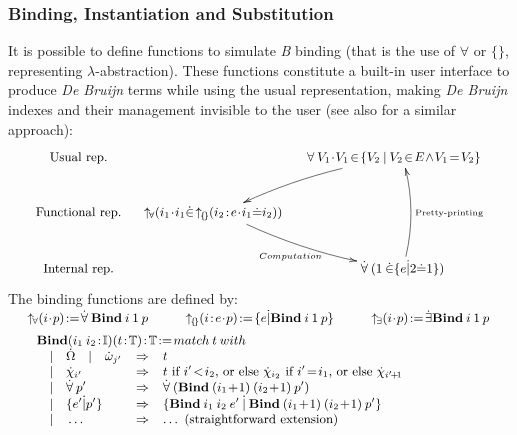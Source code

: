 \documentclass{llncs}
\begin{document}
\subsubsection{Binding, Instantiation and Substitution} It is possible to define functions to 
simulate \emph{B} binding (that is the use of $\forall$ or $\{\}$, representing 
$\lambda$-abstraction). These functions constitute a built-in user interface to produce 
\emph{De Bruijn} terms while using the usual representation, making \emph{De Bruijn} indexes 
and their management invisible to the user (see also \cite{gor:1} for a similar approach):
\[
\small
\xymatrix{
\text{Usual rep.} & & \!\!\!\!\!\!\!\!\forall\:V_1\!\cdot\!V_1\!\in\!
  \{V_2\:|\:V_2\!\in\!E\!\land\!V_1\!=\!V_2\}
 \ar@/_/@{->}[dl]  \ar@/^/@{<-}[dd]^{\text{Pretty-printing}}\\
\text{Functional rep.} &
\!\!\!\!\!\!\!\!\Bbdfor{i_1}{i_1\pins\Bbdcmp{i_2}{e}{i_1\pequ i_2}}
\ar@/_/@{->}[dr]_{Computation\quad}\\
\text{Internal rep.} & & \pfor(\dbone\:\pins\ecmp{e}{\dbtwo\pequ\dbone})\\
}
\]
The binding functions are defined by:
\[
\small
\begin{array}{lll}
\vspace{-16pt}\\
\Bbdfor{i}{p}\!:=\!\pfor \Bcmd{Bind}\:i\:\dbone\:p \quad & \quad
\Bbdcmp{i}{e}{p}\!:=\!\ecmp{e}{\Bcmd{Bind}\:i\:\dbone\:p} \quad & \quad
\Bbdexs{i}{p}\!:=\!\pexs \Bcmd{Bind}\:i\:\dbone\:p \\
\multicolumn{3}{l}{
\begin{array}{lcl}
\vspace{-6pt}\\
\multicolumn{3}{l}{\Bcmd{Bind}(i_1\:i_2\!:\!\Bidx)(t\!:\!\Btrm)\!:\!\Btrm\!:=\!match\:t\:with}
\\
\quad | \quad \ebig \quad|\quad \ebie{j'} & \Rightarrow & t\\
\quad | \quad \evar{i'} & \Rightarrow &
 t\text{ if }i'\!<\!i_2\text{, or else }
 \evar{i_2}\text{ if }i'\!=\!i_1\text{, or else }\evar{i'\!+\!1}\\
\quad | \quad \pfor p' & \Rightarrow & \pfor (\Bcmd{Bind}\:(i_1\!+\!1)\:(i_2\!+\!1)\:p')\\
\quad | \quad \ecmp{e'}{p'} & \Rightarrow & \ecmp {\Bcmd{Bind}\:i_1\:i_2\:e'\:}
                                                {\:\Bcmd{Bind}\:(i_1\!+\!1)\:(i_2\!+\!1)\:p'}\\
\quad | \quad \ldots & \Rightarrow & \ldots \text{ (straightforward extension)}\\
\end{array}
}
\end{array}
\]
\end{document}
